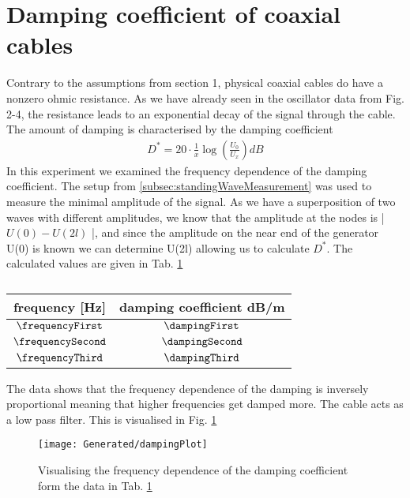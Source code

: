 \documentclass[a4paper,10pt,twocolumn]{article}
\begin{document}
    \section{Damping coefficient of coaxial cables}\label{sec:dampingCoefficient}
    Contrary to the assumptions from section 1, physical coaxial cables do have a nonzero ohmic resistance.
    As we have already seen in the oscillator data from Fig. 2-4, the resistance leads to an exponential decay of the signal through the cable.
    The amount of damping is characterised by the damping coefficient
    \begin{align}
       D^* = 20\cdot \frac{1}{x}\log(\frac{U_0}{U_x}) dB 
    \end{align}
    In this experiment we examined the frequency dependence of the damping coefficient.
    The setup from \ref{subsec:standingWaveMeasurement} was used to measure the minimal amplitude of the signal.
    As we have a superposition of two waves with different amplitudes, we know that the amplitude at the nodes is | $U(0) - U(2l)$ |, and since the amplitude on the near end of the generator U(0) is known
    we can determine U(2l) allowing us to calculate $D^*$.
    The calculated values are given in Tab. \ref{tab:dampingData}
    \begin{table}
            \centering
            \caption{}
            \label{tab:dampingData}
            \begin{tabular*}{\linewidth}{@{\extracolsep{\fill}}cc}
    \hline  
    \hline
    \rule[-7pt]{0pt}{23pt}  frequency [Hz]& damping coefficient dB/m \\
    \hline
    \rule[-5pt]{0pt}{23pt}  $\frequencyFirst$ & $ \dampingFirst $ \\
    \rule[-5pt]{0pt}{23pt}  $\frequencySecond$ & $ \dampingSecond $ \\
    \rule[-5pt]{0pt}{23pt}  $\frequencyThird$ & $\dampingThird $ \\
    \hline
    \hline   
            \end{tabular*}
        \end{table}
    The data shows that the frequency dependence of the damping is inversely proportional meaning that higher frequencies get damped more.
    The cable acts as a low pass filter.
    This is visualised in Fig. \ref{fig:damoingFigure}
    \begin{figure}\label{fig:damoingFigure}
    \begin{center}
        \texttt{[image: Generated/dampingPlot]}
        \caption[]{Visualising the frequency dependence of the damping coefficient form the data in Tab. \ref{tab:dampingData}}   %
    \end{center}
        \end{figure}
\end{document}
